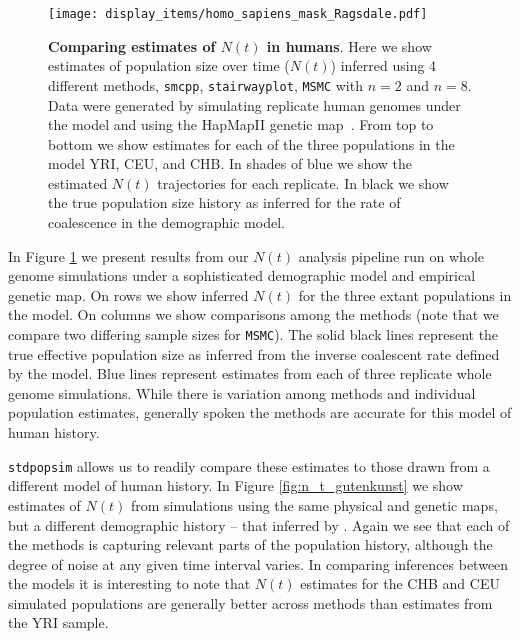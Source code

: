 \documentclass[12pt,halfline,a4paper]{ouparticle}
\newcommand{\stdpopsim}{\texttt{stdpopsim}\xspace}
\newcommand{\MSMC}{\texttt{MSMC}\xspace}
\newcommand{\smcpp}{\texttt{smcpp}\xspace}
\begin{document}
\begin{figure}
\begin{center}
\texttt{[image: display\_items/homo\_sapiens\_mask\_Ragsdale.pdf]}
\caption{\textbf{Comparing estimates of $N(t)$ in humans}. Here we show estimates of population
size over time ($N(t)$) inferred using 4 different methods, \smcpp, \texttt{stairwayplot},
\MSMC with $n=2$ and $n=8$. Data were generated by simulating
replicate human genomes under the \cite{ragsdale2019models} model and using the
HapMapII genetic map~\citep{international2007second}. From top to bottom we show estimates for each
of the three populations in the model YRI, CEU, and CHB. In shades of blue we show the estimated
$N(t)$ trajectories for each replicate. In black we show the true population size history as inferred
for the rate of coalescence in the demographic model.}
\label{fig:n_t_ragsdale}
\end{center}
\end{figure}


In Figure \ref{fig:n_t_ragsdale} we present results from our $N(t)$ analysis pipeline
run on whole genome simulations under a sophisticated demographic model
and empirical genetic map. On rows
we show inferred $N(t)$ for the three extant populations in the model.
On columns we show comparisons among the methods (note that we compare two differing
sample sizes for \MSMC). The solid black lines represent the true effective population
size as inferred from the inverse coalescent rate defined by the model.
Blue lines represent estimates from each of three replicate whole genome simulations.
While there is variation among methods and individual population estimates,
generally spoken the methods are accurate for this model of human history.

\stdpopsim allows us to readily compare these estimates to those drawn from a different
model of human history. In Figure \ref{fig:n_t_gutenkunst} we show estimates of
$N(t)$ from simulations using the same physical and genetic maps, but a different demographic
history -- that inferred by \cite{gutenkunst2009inferring}. Again we see that each
of the methods is capturing relevant parts of the population history, although the
degree of noise at any given time interval varies. In comparing inferences between the
models it is interesting to note that $N(t)$ estimates for the CHB and CEU
simulated populations are generally better across methods than estimates from the YRI
sample.
\end{document}
